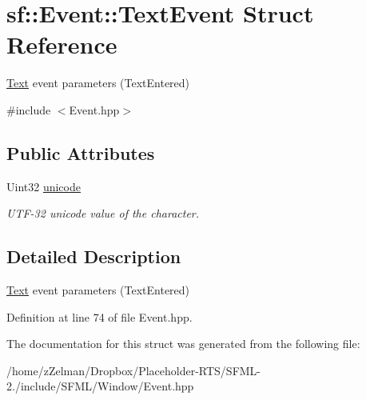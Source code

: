 \hypertarget{structsf_1_1Event_1_1TextEvent}{\section{sf\-:\-:Event\-:\-:Text\-Event Struct Reference}
\label{structsf_1_1Event_1_1TextEvent}
}


\hyperlink{classsf_1_1Text}{Text} event parameters (Text\-Entered)  




{\ttfamily \#include $<$Event.\-hpp$>$}

\subsection*{Public Attributes}
\begin{DoxyCompactItemize}
\item 
\hypertarget{structsf_1_1Event_1_1TextEvent_a00d96b1a5328a1d7cbc276e161befcb0}{Uint32 \hyperlink{structsf_1_1Event_1_1TextEvent_a00d96b1a5328a1d7cbc276e161befcb0}{unicode}}\label{structsf_1_1Event_1_1TextEvent_a00d96b1a5328a1d7cbc276e161befcb0}

\begin{DoxyCompactList}\small\item\em U\-T\-F-\/32 unicode value of the character. \end{DoxyCompactList}\end{DoxyCompactItemize}


\subsection{Detailed Description}
\hyperlink{classsf_1_1Text}{Text} event parameters (Text\-Entered) 

Definition at line 74 of file Event.\-hpp.



The documentation for this struct was generated from the following file\-:\begin{DoxyCompactItemize}
\item 
/home/z\-Zelman/\-Dropbox/\-Placeholder-\/\-R\-T\-S/\-S\-F\-M\-L-\/2./include/\-S\-F\-M\-L/\-Window/Event.\-hpp\end{DoxyCompactItemize}
